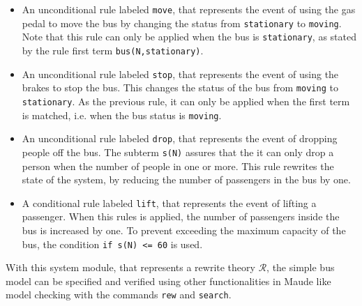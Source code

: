 \begin{itemize}
    \item An unconditional rule labeled \texttt{move}, that represents the event of using the gas pedal to move the bus by changing the status from \texttt{stationary} to \texttt{moving}. Note that this rule can only be applied when the bus is \texttt{stationary}, as stated by the rule first term \texttt{bus(N,stationary)}.
    \item An unconditional rule labeled \texttt{stop}, that represents the event of using the brakes to stop the bus. This changes the status of the bus from \texttt{moving} to \texttt{stationary}. As the previous rule, it can only be applied when the first term is matched, i.e. when the bus status is \texttt{moving}. 
    \item An unconditional rule labeled \texttt{drop}, that represents the event of dropping people off the bus. The subterm \texttt{s(N)} assures that the it can only drop a person when the number of people in one or more. This rule rewrites the state of the system, by reducing the number of passengers in the bus by one.
    \item A conditional rule labeled \texttt{lift}, that represents the event of lifting a passenger. When this rules is applied, the number of passengers inside the bus is increased by one. To prevent exceeding the maximum capacity of the bus, the condition \texttt{if s(N) <= 60} is used. 
\end{itemize}
With this system module, that represents a rewrite theory $\mathscr{R}$, the simple bus model can be specified and verified using other functionalities in Maude like model checking with the commands \texttt{rew} and \texttt{search}.


